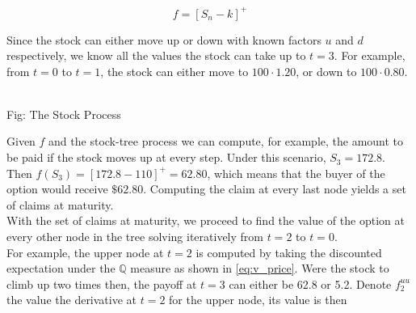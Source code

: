 \documentclass{article}
\begin{document}
\begin{equation}
    f = [S_n - k]^+
\end{equation}

Since the stock can either move up or down with known factors $u$ and $d$ respectively, we know all the values the stock can take up to $t=3$. For example, from $t=0$ to $t=1$, the stock can either move to $100 \cdot 1.20$, or down to $100 \cdot 0.80$.

\begin{center}
\\
\caption{Fig: The Stock Process}
\end{center}

Given $f$ and the stock-tree process we can compute, for example, the amount to be paid if the stock moves up at every step. Under this scenario, $S_3 = 172.8$. Then $f(S_3) = [172.8 - 110]^+ = 62.80$, which means that the buyer of the option would receive $\$62.80$. Computing the claim at every last node yields a set of claims at maturity.\\

With the set of claims at maturity, we proceed to find the value of the option at every other node in the tree solving iteratively from $t=2$ to $t=0$.\\

For example, the upper node at $t=2$ is computed by taking the discounted expectation under the $\mathbb{Q}$ measure as shown in \ref{eq:v_price}. Were the stock to climb up two times then, the payoff at $t=3$ can either be 62.8 or 5.2. Denote $f^{uu}_2$ the value the derivative at $t=2$ for the upper node, its value is then
\end{document}
